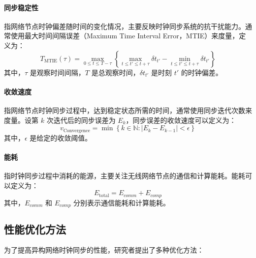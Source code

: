 \documentclass[UTF8,a4paper,12pt]{ctexart}
\numberwithin{equation}{section}
\begin{document}
\paragraph{同步稳定性}指网络节点时钟偏差随时间的变化情况，主要反映时钟同步系统的抗干扰能力。通常使用最大时间间隔误差（Maximum Time Interval Error，MTIE）来度量，定义为：
\begin{equation}
	T_\text{MTIE}(\tau) = \max_{0 \leq t \leq T - \tau} \left\{ \max_{t \leq t' \leq t + \tau} \delta t_{t'} - \min_{t \leq t' \leq t + \tau} \delta t_{t'} \right\}
\end{equation}
其中，$\tau$ 是观察时间间隔，$T$ 是总观察时间，$\delta t_{t'}$ 是时刻 $t'$ 的时钟偏差。
\paragraph{收敛速度}指网络节点时钟同步过程中，达到稳定状态所需的时间，通常使用同步迭代次数来度量。设第 $k$ 次迭代后的同步误差为 $E_k$，同步误差的收敛速度可以定义为：
	\begin{equation}
		v_\text{Convergence} = \min \left\{ k \in \mathbb{N} : |E_k - E_{k-1}| < \epsilon \right\}
	\end{equation}
	其中，$\epsilon$ 是给定的收敛阈值。
\paragraph{能耗}指时钟同步过程中消耗的能源，主要关注无线网络节点的通信和计算能耗。能耗可以定义为：
	\begin{equation}
		E_\text{total}= E_{comm} + E_{comp}
	\end{equation}
	其中，$E_{comm}$ 和 $E_{comp}$ 分别表示通信能耗和计算能耗。
\subsection{性能优化方法}

为了提高异构网络时钟同步的性能，研究者提出了多种优化方法：
\end{document}
